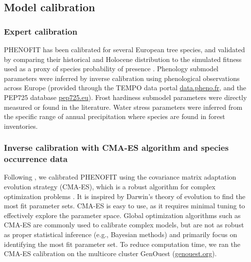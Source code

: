 \documentclass[preprint,12pt,authoryear]{elsarticle}
\begin{document}
\subsection{Model calibration}

\subsubsection{Expert calibration}

PHENOFIT has been calibrated for several European tree species, and validated  by comparing their historical and Holocene distribution to the simulated fitness used as a proxy of species probability of presence  \citep{Saltre2013, Duputie2015, Gauzere2020, VanderMeersch2025}. Phenology submodel parameters were inferred by inverse \textcolor{customred}{calibration} using phenological \textcolor{customred}{observations} across Europe (provided through the TEMPO data portal \url{data.pheno.fr}, and the PEP725 database \url{pep725.eu}).
\textcolor{customred}{Frost hardiness submodel parameters were directly measured or found in the literature. Water stress parameters were inferred from the specific range of annual precipitation where species are found in forest inventories.}


\subsubsection{Inverse calibration with CMA-ES algorithm and species occurrence data}

Following \citet{VanderMeersch2023}, we calibrated PHENOFIT using the covariance matrix adaptation evolution strategy (CMA-ES), which  is a robust algorithm for complex optimization problems \citep{Hansen2001}. It is inspired by Darwin's theory of evolution to find the most fit parameter sets. \textcolor{customred}{CMA-ES is easy to use, as it requires minimal tuning to effectively explore the parameter space. Global optimization algorithms such as CMA-ES are commonly used to calibrate complex models, but are not as robust as proper statistical inference (e.g., Bayesian methods) and primarily focus on identifying the most fit parameter set. To reduce computation time}, we ran the CMA-ES calibration on the multicore cluster GenOuest (\url{genouest.org}).
\end{document}
